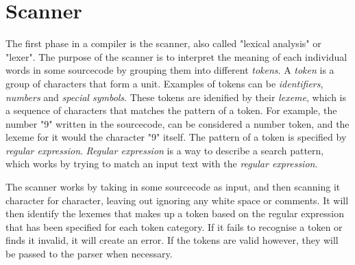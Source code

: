 \section{Scanner} \label{chap:scanner}

The first phase in a compiler is the scanner, also called "lexical analysis" or "lexer".
The purpose of the scanner is to interpret the meaning of each individual words in some sourcecode 
by grouping them into different \emph{tokens}.
A \emph{token} is a group of characters that form a unit. Examples of tokens can be 
\emph{identifiers}, \emph{numbers} and \emph{special symbols}. 
These tokens are idenified by their \emph{lexeme}, which is a sequence of characters that matches the pattern of a token.
For example, the number "9" written
in the sourcecode, can be considered a number token, and the lexeme for it would the character "9" itself. 
The pattern of a token is specified by \emph{regular expression}.
\emph{Regular expression} is a way to describe a search pattern, which works by trying to match an input
text with the \emph{regular expression}.


The scanner works by taking in some sourcecode as input, and then scanning it character for character, 
leaving out ignoring any white space or comments. It will then identify the lexemes that makes up a token
based on the regular expression that has been specified for each token category. If it fails to recognise 
a token or finds it invalid, it will create an error. If the tokens are valid however, they
will be passed to the parser when necessary. 






